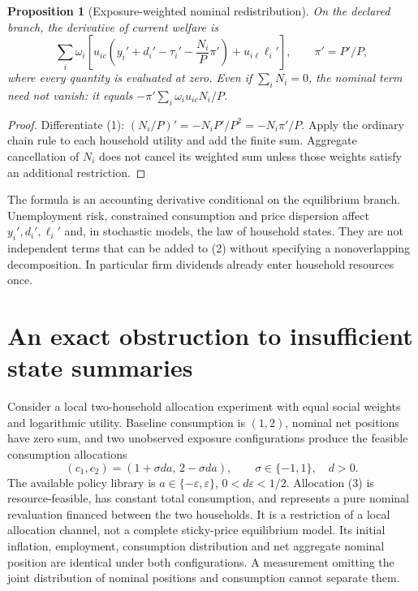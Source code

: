 \documentclass[11pt]{article}
\newtheorem{proposition}[theorem]{Proposition}
\theoremstyle{remark}
\begin{document}
\begin{proposition}[Exposure-weighted nominal redistribution]
On the declared branch, the derivative of current welfare is
\[
 \sum_i\omega_i\left[
 u_{ic}\left(y_i'+d_i'-\tau_i'-\frac{N_i}{P}\pi'\right)
 +u_{i\ell}\ell_i'\right],\qquad \pi'=P'/P, \tag{2}
\]
where every quantity is evaluated at zero. Even if $\sum_iN_i=0$, the
nominal term need not vanish: it equals
$-\pi'\sum_i\omega_i u_{ic}N_i/P$.
\end{proposition}
\begin{proof}
Differentiate (1): $(N_i/P)'=-N_iP'/P^2=-N_i\pi'/P$.
Apply the ordinary chain rule to each household utility and add the finite
sum. Aggregate cancellation of $N_i$ does not cancel its weighted sum
unless those weights satisfy an additional restriction.
\end{proof}
The formula is an accounting derivative conditional on the equilibrium
branch. Unemployment risk, constrained consumption and price dispersion
affect $y_i',d_i',\ell_i'$ and, in stochastic models, the law of household
states. They are not independent terms that can be added to (2) without
specifying a nonoverlapping decomposition. In particular firm dividends
already enter household resources once.

\section{An exact obstruction to insufficient state summaries}
Consider a local two-household allocation experiment with equal social
weights and logarithmic utility. Baseline consumption is $(1,2)$, nominal
net positions have zero sum, and two unobserved exposure configurations
produce the feasible consumption allocations
\[
 (c_1,c_2)=(1+\sigma da,\,2-\sigma da),
 \qquad \sigma\in\{-1,1\},\quad d>0. \tag{3}
\]
The available policy library is $a\in\{-\varepsilon,\varepsilon\}$,
$0<d\varepsilon<1/2$. Allocation (3) is resource-feasible, has constant
total consumption, and represents a pure nominal revaluation financed
between the two households. It is a restriction of a local allocation
channel, not a complete sticky-price equilibrium model. Its initial
inflation, employment, consumption distribution and net aggregate nominal
position are identical under both configurations. A measurement omitting
the joint distribution of nominal positions and consumption cannot
separate them.
\end{document}
